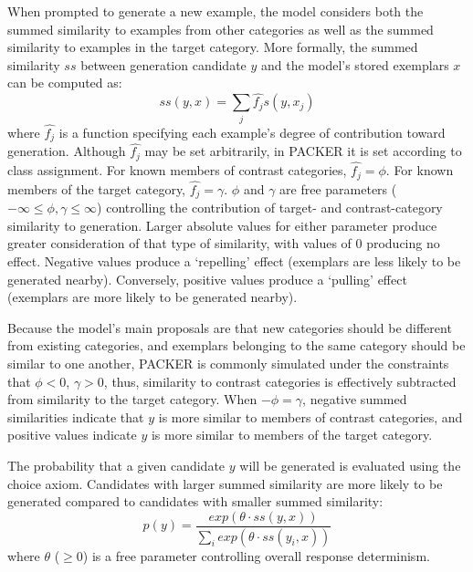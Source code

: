 \documentclass[10pt,letterpaper]{article}
\begin{document}

When prompted to generate a new example, the model considers both the summed similarity to examples from other categories as well as the summed similarity to examples in the target category. More formally, the summed similarity $ss$ between generation candidate $y$ and the model's stored exemplars $x$ can be computed as:
\begin{equation}
  ss(y, x) = \sum_j{\hat{f_j} s(y, x_j)}
  \label{eq:packer-ss}
\end{equation}
where $\hat{f_j}$ is a function specifying each example's degree of contribution toward generation. Although $\hat{f_j}$ may be set arbitrarily, in PACKER it is set according to class assignment. For known members of contrast categories, $\hat{f_j} = \phi$. For known members of the target category, $\hat{f_j} = \gamma$. $\phi$ and $\gamma$ are free parameters ($-\infty \leq \phi, \gamma \leq \infty$) controlling the contribution of target- and contrast-category similarity to generation. Larger absolute values for either parameter produce greater consideration of that type of similarity, with values of 0 producing no effect. Negative values produce a `repelling' effect (exemplars are less likely to be generated nearby). Conversely, positive values produce a `pulling' effect (exemplars are more likely to be generated nearby). 

Because the model's main proposals are that new categories should be different from existing categories, and exemplars belonging to the same category should be similar to one another, PACKER is commonly simulated under the constraints that $\phi < 0$, $\gamma > 0$, thus, similarity to contrast categories is effectively subtracted from similarity to the target category. When $-\phi = \gamma$, negative summed similarities indicate that $y$ is more similar to members of contrast categories, and positive values indicate $y$ is more similar to members of the target category.

The probability that a given candidate $y$ will be generated is evaluated using the \citet{luce1977choice} choice axiom. Candidates with larger summed similarity are more likely to be generated compared to candidates with smaller summed similarity:
\begin{equation}
p(y) = \dfrac
    { exp( { \theta \cdot ss(y, x) } ) }
    { \sum_i{ exp( { \theta \cdot ss(y_i, x) } ) } }
    \label{eq:packer-choice}
\end{equation}
where $\theta$ ($\geq 0$) is a free parameter controlling overall response determinism. 
\end{document}
